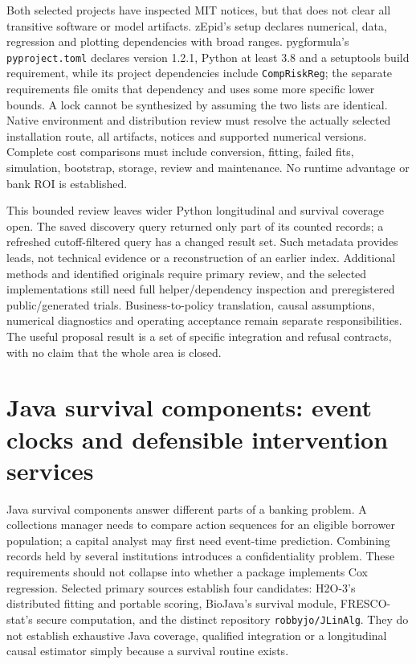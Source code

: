 Both selected projects have inspected MIT notices, but that does not clear
all transitive software or model artifacts. zEpid's setup declares numerical,
data, regression and plotting dependencies with broad ranges. pygformula's
\texttt{pyproject.toml} declares version 1.2.1, Python at least 3.8 and a
setuptools build requirement, while its project dependencies include
\texttt{CompRiskReg}; the separate requirements file omits that dependency
and uses some more specific lower bounds. A lock cannot be synthesized by
assuming the two lists are identical. Native environment and distribution
review must resolve the actually selected installation route, all artifacts,
notices and supported numerical versions. Complete cost comparisons must
include conversion, fitting, failed fits, simulation, bootstrap, storage,
review and maintenance. No runtime advantage or bank ROI is established.
\citep{exec24_longpy_zepid_source,exec24_longpy_pygformula_source}

This bounded review leaves wider Python longitudinal and survival coverage
open. The saved discovery query returned only part of its counted records;
a refreshed cutoff-filtered query has a changed result set. Such metadata
provides leads, not technical evidence or a reconstruction of an earlier
index. Additional methods and identified originals require primary review,
and the selected implementations still need full helper/dependency inspection
and preregistered public/generated trials. Business-to-policy translation,
causal assumptions, numerical diagnostics and operating acceptance remain
separate responsibilities. The useful proposal result is a set of specific
integration and refusal contracts, with no claim that the whole area is closed.


\section{Java survival components: event clocks and defensible intervention services}
\label{sec:exec24-longitudinal-java}
Java survival components answer different parts of a banking problem. A
collections manager needs to compare action sequences for an eligible borrower
population; a capital analyst may first need event-time prediction. Combining
records held by several institutions introduces a confidentiality problem.
These requirements should not collapse into whether a package implements Cox
regression. Selected primary sources establish four candidates: H2O-3's
distributed fitting and portable scoring, BioJava's survival module,
FRESCO-stat's secure computation, and the distinct repository
\texttt{robbyjo/JLinAlg}. They do not establish exhaustive Java coverage,
qualified integration or a longitudinal causal estimator simply because a
survival routine exists.
\citep{exec24_longjava_h2o,exec24_longjava_biojava,exec24_longjava_fresco,exec24_longjava_jlinalg}

